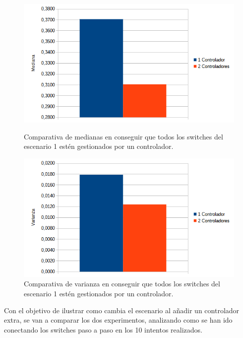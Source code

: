 \documentclass[a4paper, 12pt]{book}
\begin{document}
 	 
 	 \begin{figure}[H]
 	 	\centering
 	 	\begin{minipage}[b]{0.45\textwidth}
 	 		\centering
 	 		\includegraphics[width=\textwidth]{img/comparativamedianabucle.png}
 	 		\caption{Comparativa de medianas en conseguir que todos los switches del escenario 1 estén gestionados por un controlador.}
 	 		\label{fig:mediana}
 	 	\end{minipage}
 	 	\hfill
 	 	\begin{minipage}[b]{0.45\textwidth}
 	 		\centering
 	 		\includegraphics[width=\textwidth]{img/comparativavarianzabucle.png}
 	 		\caption{Comparativa de varianza en conseguir que todos los switches del escenario 1 estén gestionados por un controlador.}
 	 		\label{fig:varianza}
 	 	\end{minipage}
 	 \end{figure}
 	 	
 
 	
 	Con el objetivo de ilustrar como cambia el escenario al añadir un controlador extra, se van a comparar los dos experimentos, analizando como se han ido conectando los switches paso a paso en los 10 intentos realizados.
 	
\end{document}
